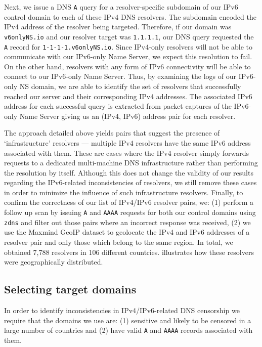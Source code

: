 Next, we issue a DNS {\tt A} query for a resolver-specific subdomain of our
IPv6 control domain to each of these IPv4 DNS resolvers. The subdomain encoded
the IPv4 address of the resolver being targeted. Therefore, if our domain was
{\tt v6onlyNS.io} and our resolver target was {\tt 1.1.1.1}, our DNS query
requested the {\tt A} record for {\tt 1-1-1-1.v6onlyNS.io}.
%
Since IPv4-only resolvers will not be able to communicate with our IPv6-only
Name Server, we expect this resolution to fail. On the other hand, resolvers
with any form of IPv6 connectivity will be able to connect to our IPv6-only
Name Server.
%
Thus, by examining the logs of our IPv6-only NS domain, we are able
to identify the set of resolvers that successfully reached our server and
their corresponding IPv4 addresses. The associated IPv6 address for each
successful query is extracted from packet captures of the IPv6-only Name
Server giving us an (IPv4, IPv6) address pair for each resolver.

The approach detailed above yields pairs that suggest the presence of
`infrastructure' resolvers --- \eg multiple IPv4 resolvers have the same IPv6
address associated with them. These are cases where the IPv4 resolver simply
forwards requests to a dedicated multi-machine DNS infrastructure rather than
performing the resolution by itself. Although this does not change the validity
of our results regarding the IPv6-related inconsistencies of resolvers, we
still remove these cases in order to minimize the influence of such
infrastructure resolvers.
%
Finally, to confirm the correctness of our list of IPv4/IPv6 resolver pairs,
we: (1) perform a follow up scan by issuing {\tt A} and {\tt AAAA} requests for
both our control domains using {\tt zdns} \cite{Durumeric13zmap} and filter out
those pairs where an incorrect response was received, (2) we use the Maxmind
GeoIP dataset \cite{maxmind-connectiondb} to geolocate the IPv4 and IPv6
addresses of a resolver pair and only those which belong to the same region.
% 
In total, we obtained 7,788 resolvers in 106 different countries.
 illustrates how these resolvers were
geographically distributed.


\subsection{Selecting target domains}
\label{sec:methodology:domains}
In order to identify inconsistencies in IPv4/IPv6-related DNS censorship we
require that the domains we use are: (1) sensitive and likely to be censored in
a large number of countries and (2) have valid {\tt A} and {\tt AAAA} records
associated with them.

